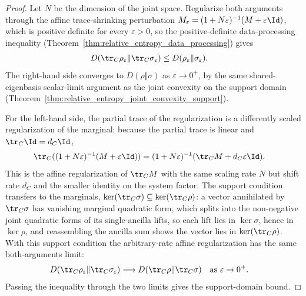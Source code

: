 \begin{proof}\leanok
    Let $N$ be the dimension of the joint space. Regularize both arguments through
    the affine trace-shrinking perturbation
    $M_\varepsilon=(1+N\varepsilon)^{-1}(M+\varepsilon\Id)$, which is
    positive definite for every $\varepsilon>0$, so the positive-definite
    data-processing inequality
    (Theorem~\ref{thm:relative_entropy_data_processing}) gives
    \begin{align}
        D(\tr_C\rho_\varepsilon\Vert\tr_C\sigma_\varepsilon)
         & \le D(\rho_\varepsilon\Vert\sigma_\varepsilon).
        \notag
    \end{align}
    The right-hand side converges to $D(\rho\Vert\sigma)$ as
    $\varepsilon\to0^+$, by the same shared-eigenbasis scalar-limit argument as the
    joint convexity on the support domain
    (Theorem~\ref{thm:relative_entropy_joint_convexity_support}).

    For the left-hand side, the partial trace of the regularization is a
    differently scaled regularization of the marginal: because the partial trace is
    linear and $\tr_C\Id=d_C\Id$,
    \begin{align}
        \tr_C((1+N\varepsilon)^{-1}(M+\varepsilon\Id))
         & =(1+N\varepsilon)^{-1}
        (\tr_C M+d_C\varepsilon\Id).
        \notag
    \end{align}
    This is the affine regularization of $\tr_C M$ with the same scaling rate $N$
    but shift rate $d_C$ and the smaller identity on the system factor. The support
    condition transfers to the marginals,
    $\ker(\tr_C\sigma)\subseteq\ker(\tr_C\rho)$: a vector annihilated by
    $\tr_C\sigma$ has vanishing marginal quadratic form, which splits into the
    non-negative joint quadratic forms of its single-ancilla lifts, so each lift lies
    in $\ker\sigma$, hence in $\ker\rho$, and reassembling the ancilla sum shows
    the vector lies in $\ker(\tr_C\rho)$. With this support condition the
    arbitrary-rate affine regularization has the same both-arguments limit:
    \begin{align}
        D(\tr_C\rho_\varepsilon\Vert\tr_C\sigma_\varepsilon)
         & \longrightarrow D(\tr_C\rho\Vert\tr_C\sigma)
        \quad\text{as }\varepsilon\to0^+.
        \notag
    \end{align}
    Passing the inequality through the two limits gives the support-domain bound.
\end{proof}
